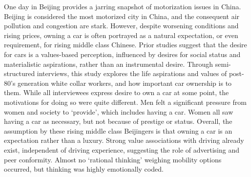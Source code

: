 One day in Beijing provides a jarring snapshot of motorization issues in China. Beijing is considered the most motorized city in China, and the consequent air pollution and congestion are stark. However, despite worsening conditions and rising prices, owning a car is often portrayed as a natural expectation, or even requirement, for rising middle class Chinese. Prior studies suggest that the desire for cars is a values-based perception, influenced by desires for social status and materialistic aspirations, rather than an instrumental desire. Through semi-structured interviews, this study explores the life aspirations and values of post-80’s generation white collar workers, and how important car ownership is to them. While all interviewees express desire to own a car at some point, the motivations for doing so were quite different. Men felt a significant pressure from women and society to ‘provide’, which includes having a car. Women all saw having a car as necessary, but not because of prestige or status. Overall, the assumption by these rising middle class Beijingers is that owning a car is an expectation rather than a luxury. Strong value associations with driving already exist, independent of driving experience, suggesting the role of advertising and peer conformity. Almost no ‘rational thinking’ weighing mobility options occurred, but thinking was highly emotionally coded.
